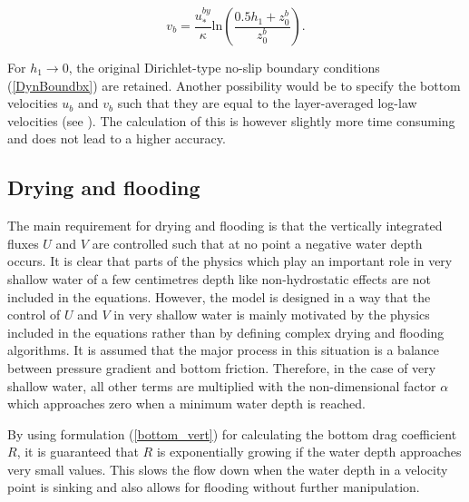 \begin{equation}\label{vlogdis}
v_b = \frac{u_*^{by}}{\kappa}\mbox{ln} \left(\frac{0.5h_1+z_0^b}{z_0^b}\right).
\end{equation}

For $h_1\rightarrow 0$, the original 
Dirichlet-type
no-slip boundary conditions (\ref{DynBoundbx}) are retained.
Another possibility would be to specify the bottom velocities $u_b$ and $v_b$
such that they are equal to the layer-averaged 
log-law velocities
(see \cite{BAUMERTea92}).
The calculation of this is however slightly more time consuming
and does not lead to a higher accuracy.



\subsection{Drying and flooding}\label{Section_dry}

The main requirement for drying and flooding is that the
vertically integrated fluxes $U$ and $V$ are controlled such
that at no point a negative water depth occurs.
It is clear that parts of the physics which
play an important role in very shallow water of a
few centimetres depth
like non-hydrostatic effects
are not included in the equations.
However, the model is designed in a way that the control of $U$ and $V$
in very shallow water is mainly motivated by the physics
included in the equations
rather than by defining complex drying and flooding algorithms.
It is assumed that the major process in this
situation is a balance between pressure gradient and bottom friction.
Therefore, in the case of very shallow water, all other terms are multiplied
with the non-dimensional factor $\alpha$ which approaches zero
when a minimum water depth is reached.

By using formulation (\ref{bottom_vert})
for calculating the bottom drag coefficient $R$,
it is guaranteed that $R$ is exponentially growing if the water depth
approaches very small values.
This slows the flow down when the water depth in a
velocity point is sinking and also allows for flooding without
further manipulation.

